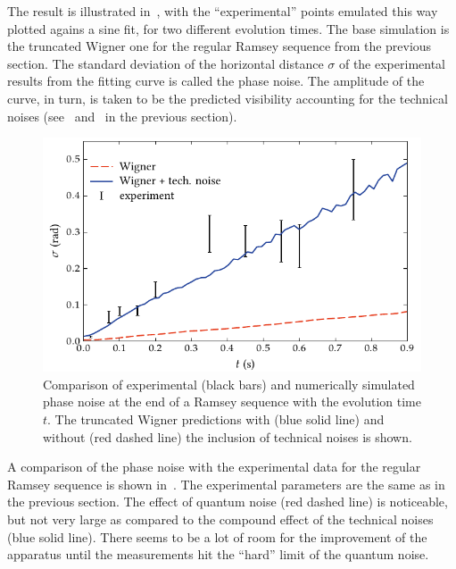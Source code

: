 The result is illustrated in~, with the ``experimental'' points emulated this way plotted agains a sine fit, for two different evolution times.
The base simulation is the truncated Wigner one for the regular Ramsey sequence from the previous section.
The standard deviation of the horizontal distance $\sigma$ of the experimental results from the fitting curve is called the phase noise.
The amplitude of the curve, in turn, is taken to be the predicted visibility accounting for the technical noises (see~ and~ in the previous section).

\begin{figure}
    \centerline{\includegraphics{figures_generated/bec_noise/ramsey_noise.pdf}}

    \caption[Experimental and numerically simulated phase noise in Ramsey sequence]{
    Comparison of experimental (black bars) and numerically simulated phase noise at the end of a Ramsey sequence with the evolution time $t$.
    The truncated Wigner predictions with (blue solid line) and without (red dashed line) the inclusion of technical noises is shown.}%

    \label{fig:bec-noise:phase-noise:ramsey-phnoise}
\end{figure}

A comparison of the phase noise with the experimental data for the regular Ramsey sequence is shown in~.
The experimental parameters are the same as in the previous section.
The effect of quantum noise (red dashed line) is noticeable, but not very large as compared to the compound effect of the technical noises (blue solid line).
There seems to be a lot of room for the improvement of the apparatus until the measurements hit the ``hard'' limit of the quantum noise.

